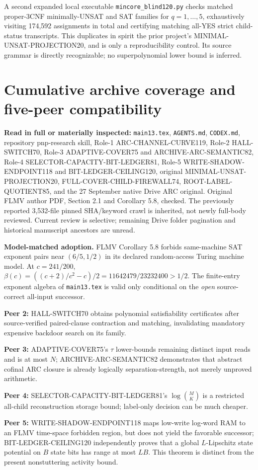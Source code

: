 \documentclass[11pt]{article}
\begin{document}
A second expanded local executable \texttt{mincore\_blind120.py} checks matched proper-3CNF minimally-UNSAT and SAT families for $q=1,\ldots,5$, exhaustively visiting 174,592 assignments in total and certifying matching all-YES strict child-status transcripts. This duplicates in spirit the prior project's MINIMAL-UNSAT-PROJECTION20, and is only a reproducibility control. Its source grammar is directly recognizable; no superpolynomial lower bound is inferred.

\section{Cumulative archive coverage and five-peer compatibility}
\noindent\textbf{Read in full or materially inspected:} \texttt{main13.tex}, \texttt{AGENTS.md}, \texttt{CODEX.md}, repository pnp-research skill, Role-1 ARC-CHANNEL-CURVE119, Role-2 HALL-SWITCH70, Role-3 ADAPTIVE-COVER75 and ARCHIVE-ARC-SEMANTIC82, Role-4 SELECTOR-CAPACITY-BIT-LEDGER81, Role-5 WRITE-SHADOW-ENDPOINT118 and BIT-LEDGER-CEILING120, original MINIMAL-UNSAT-PROJECTION20, FULL-COVER-CHILD-FIREWALL74, ROOT-LABEL-QUOTIENT85, and the 27 September native Drive ARC original. Original FLMV author PDF, Section 2.1 and Corollary 5.8, checked. The previously reported 3,532-file pinned SHA/keyword crawl is inherited, not newly full-body reviewed. Current review is selective; remaining Drive folder pagination and historical manuscript ancestors are unread.
\par\noindent\textbf{Model-matched adoption.} FLMV Corollary 5.8 forbids same-machine SAT exponent pairs near $(6/5,1/2)$ in its declared random-access Turing machine model. At $c=241/200$, $\beta(c)=((c+2)/c^2-c)/2=11642479/23232400>1/2$. The finite-entry exponent algebra of \texttt{main13.tex} is valid only conditional on the \emph{open} source-correct all-input successor.
\par\noindent\textbf{Peer 2:} HALL-SWITCH70 obtains polynomial satisfiability certificates after source-verified paired-clause contraction and matching, invalidating mandatory expensive backdoor search on its family.
\par\noindent\textbf{Peer 3:} ADAPTIVE-COVER75's $\tau$ lower-bounds remaining distinct input reads and is at most $N$; ARCHIVE-ARC-SEMANTIC82 demonstrates that abstract cofinal ARC closure is already logically separation-strength, not merely unproved arithmetic.
\par\noindent\textbf{Peer 4:} SELECTOR-CAPACITY-BIT-LEDGER81's $\log\binom{M}{K}$ is a restricted all-child reconstruction storage bound; label-only decision can be much cheaper.
\par\noindent\textbf{Peer 5:} WRITE-SHADOW-ENDPOINT118 maps low-write log-word RAM to an FLMV time-space forbidden region, but does not yield the favorable successor; BIT-LEDGER-CEILING120 independently proves that a global $L$-Lipschitz state potential on $B$ state bits has range at most $LB$. This theorem is distinct from the present nonstuttering activity bound.
\end{document}
